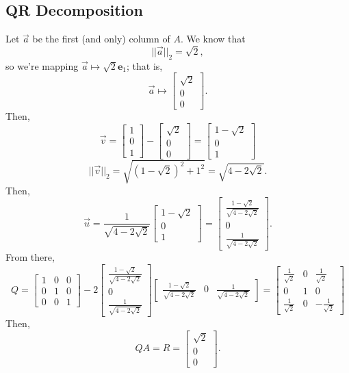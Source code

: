 \documentclass[letterpaper]{article}
\newcommand{\0}{\mathbf{0}}
\newcommand{\e}{\mathbf{e}}
\begin{document}
\subsection*{QR Decomposition}
Let $\vec{a}$ be the first (and only) column of $A$. We know that \[||\vec{a}||_2 = \sqrt{2},\] so we're mapping $\vec{a} \mapsto \sqrt{2}\e_1$; that is, 
\[\vec{a} \mapsto \begin{bmatrix}
    \sqrt{2} \\ 0 \\ 0
\end{bmatrix}.\] Then, 
\[\vec{v} = \begin{bmatrix}
    1 \\ 0 \\ 1
\end{bmatrix} - \begin{bmatrix}
    \sqrt{2} \\ 0 \\ 0
\end{bmatrix} = \begin{bmatrix}
    1 - \sqrt{2} \\ 0 \\ 1
\end{bmatrix}\] \[||\vec{v}||_2 = \sqrt{(1 - \sqrt{2})^2 + 1^2} = \sqrt{4 - 2\sqrt{2}}.\] Then, 
\[\vec{u} = \frac{1}{\sqrt{4 - 2\sqrt{2}}} \begin{bmatrix}
    1 - \sqrt{2} \\ 0 \\ 1
\end{bmatrix} = \begin{bmatrix}
    \frac{1-\sqrt{2}}{\sqrt{4-2\sqrt{2}}}\\ 
    0
    \\ \frac{1}{\sqrt{4-2\sqrt{2}}}
\end{bmatrix}.\] From there, 
\[Q = \begin{bmatrix}
    1 & 0 & 0 \\
    0 & 1 & 0 \\ 
    0 & 0 & 1
\end{bmatrix} - 2\begin{bmatrix}
    \frac{1-\sqrt{2}}{\sqrt{4-2\sqrt{2}}}\\ 
    0
    \\ \frac{1}{\sqrt{4-2\sqrt{2}}}
\end{bmatrix}\begin{bmatrix}
    \frac{1-\sqrt{2}}{\sqrt{4-2\sqrt{2}}}& 
    0
    & \frac{1}{\sqrt{4-2\sqrt{2}}}
\end{bmatrix} = \begin{bmatrix}
    \frac{1}{\sqrt{2}} & 0 & \frac{1}{\sqrt{2}}\\ 
    0 & 1 & 0 \\ 
    \frac{1}{\sqrt{2}} & 0 & -\frac{1}{\sqrt{2}}
\end{bmatrix}\]
Then, 
\[QA = R = \begin{bmatrix}
    \sqrt{2} \\ 0 \\ 0
\end{bmatrix}.\]
\end{document}
